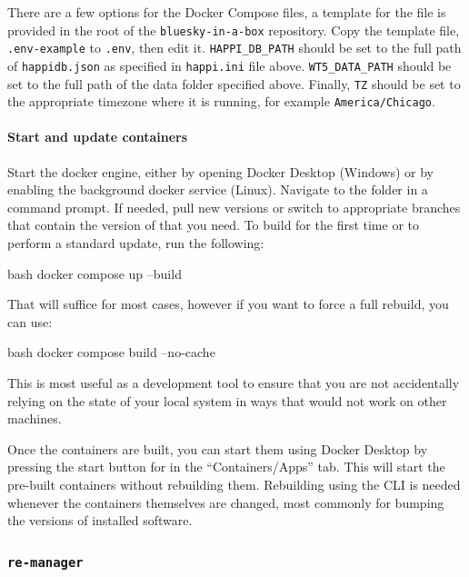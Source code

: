 There are a few options for the Docker Compose files, a template for the file is provided in the root of the \texttt{bluesky-in-a-box} repository.
Copy the template file, \nolinkurl{.env-example} to \nolinkurl{.env}, then edit it.
\texttt{HAPPI\_DB\_PATH} should be set to the full path of \nolinkurl{happidb.json} as specified in \nolinkurl{happi.ini} file above.
\texttt{WT5\_DATA\_PATH} should be set to the full path of the data folder specified above.
Finally, \texttt{TZ} should be set to the appropriate timezone where it is running, for example \texttt{America/Chicago}.


\paragraph{Start and update containers}
Start the docker engine, either by opening Docker Desktop (Windows) or by enabling the background docker service (Linux).
Navigate to the \biab folder in a command prompt.
If needed, pull new versions or switch to appropriate branches that contain the version of \biab that you need.
To build for the first time or to perform a standard update, run the following:

\begin{codefragment}{bash}
docker compose up --build
\end{codefragment}

That will suffice for most cases, however if you want to force a full rebuild, you can use:

\begin{codefragment}{bash}
docker compose build --no-cache
\end{codefragment}

This is most useful as a development tool to ensure that you are not accidentally relying on the state of your local system in ways that would not work on other machines.

Once the containers are built, you can start them using Docker Desktop by pressing the start button for \biab in the ``Containers/Apps'' tab.
This will start the pre-built containers without rebuilding them.
Rebuilding using the CLI is needed whenever the containers themselves are changed, most commonly for bumping the versions of installed software.


\subsubsection{\texttt{re-manager}}

